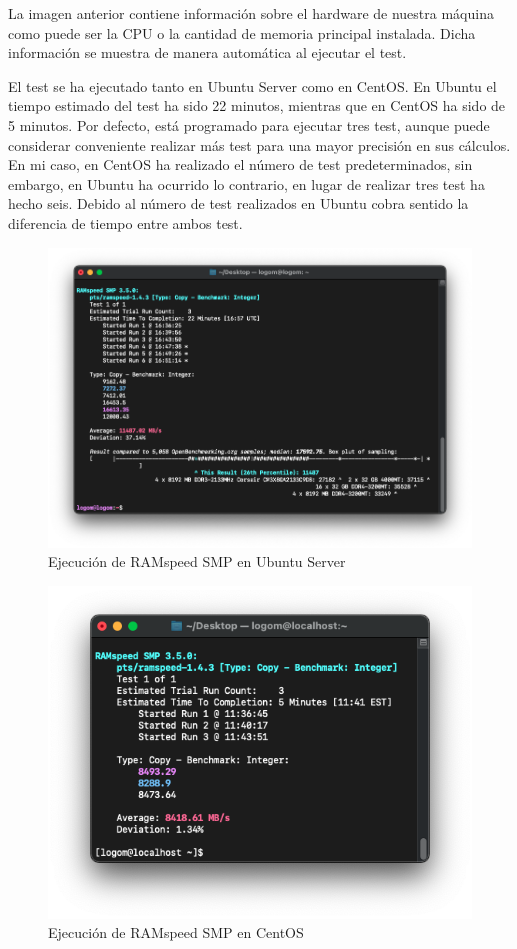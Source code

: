 La imagen anterior contiene información sobre el hardware de nuestra máquina como puede ser la CPU o la cantidad de memoria principal instalada. Dicha información se muestra de
manera automática al ejecutar el test.

El test se ha ejecutado tanto en Ubuntu Server como en CentOS. En Ubuntu el tiempo estimado del test ha sido 22 minutos, mientras que en CentOS ha sido de 5 minutos. Por defecto, 
está programado para ejecutar tres test, aunque puede considerar conveniente realizar más test para una mayor precisión en sus cálculos. En mi caso, en CentOS ha realizado el
número de test predeterminados, sin embargo, en Ubuntu ha ocurrido lo contrario, en lugar de realizar tres test ha hecho seis. Debido al número de test realizados en Ubuntu cobra
sentido la diferencia de tiempo entre ambos test.

\begin{figure}[H]
    \centering
    \includegraphics[scale=0.5]{images/ramspeed_ubuntu.png}
    \caption{Ejecución de RAMspeed SMP en Ubuntu Server}
    \label{fig:ramspeed_ubuntu}
\end{figure}

\begin{figure}[H]
    \centering
    \includegraphics[scale=0.6]{images/ramspeed_centos.png}
    \caption{Ejecución de RAMspeed SMP en CentOS}
    \label{fig:ramspeed_centos}
\end{figure}

